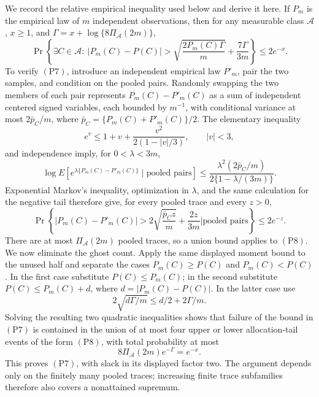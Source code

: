 We record the relative empirical inequality used below and derive it here.
If \(P_m\) is the empirical law of \(m\) independent observations, then for
any measurable class \(\mathcal A\), \(x\geq1\), and
\(\Gamma=x+\log\{8\Pi_{\mathcal A}(2m)\}\),
\[
 \Pr\!\left\{\exists C\in\mathcal A:\ |P_m(C)-P(C)|>
 \sqrt{\frac{2P_m(C)\Gamma}{m}}+\frac{7\Gamma}{3m}\right\}
 \leq2e^{-x}.
 \tag{P7}
\]
To verify \((\mathrm{P7})\), introduce an independent empirical law
\(P'_m\), pair the two samples, and condition on the pooled pairs.  Randomly
swapping the two members of each pair represents
\(P_m(C)-P'_m(C)\) as a sum of independent centered signed variables, each
bounded by \(m^{-1}\), with conditional variance at most
\(2\bar p_C/m\), where
\(\bar p_C=\{P_m(C)+P'_m(C)\}/2\).  The elementary inequality
\[
 e^v\leq1+v+\frac{v^2}{2(1-|v|/3)},\qquad |v|<3,
\]
and independence imply, for \(0<\lambda<3m\),
\[
 \log E\!\left[
 e^{\lambda\{P_m(C)-P'_m(C)\}}\mid\text{pooled pairs}\right]
 \leq\frac{\lambda^2(2\bar p_C/m)}{2\{1-\lambda/(3m)\}}.
\]
Exponential Markov's inequality, optimization in \(\lambda\), and the same
calculation for the negative tail therefore give, for every pooled trace and
every \(z>0\),
\[
 \Pr\!\left\{|P_m(C)-P'_m(C)|>
 2\sqrt{\frac{\bar p_Cz}{m}}+\frac{2z}{3m}
 \mathrel{\Big|}\text{pooled pairs}\right\}\leq2e^{-z}.
 \tag{P8}
\]
There are at most \(\Pi_{\mathcal A}(2m)\) pooled traces, so a union bound
applies to \((\mathrm{P8})\).  We now eliminate the ghost count.  Apply the
same displayed moment bound to the unused half and separate the cases
\(P_m(C)\geq P(C)\) and \(P_m(C)<P(C)\).  In the first case substitute
\(P(C)\leq P_m(C)\); in the second substitute
\(P(C)\leq P_m(C)+d\), where \(d=|P_m(C)-P(C)|\).  In the latter case use
\[
 2\sqrt{d\Gamma/m}\leq d/2+2\Gamma/m.
\]
Solving the resulting two quadratic inequalities shows that failure of the
bound in \((\mathrm{P7})\) is contained in the union of at most four upper
or lower allocation-tail events of the form \((\mathrm{P8})\), with total
probability at most
\[
 8\Pi_{\mathcal A}(2m)e^{-\Gamma}=e^{-x}.
\]
This proves \((\mathrm{P7})\), with slack in its displayed factor two.  The
argument depends only on the finitely many pooled traces; increasing finite
trace subfamilies therefore also covers a nonattained supremum.

